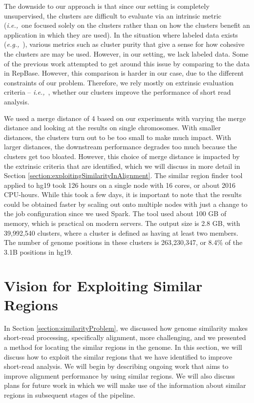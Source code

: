 \documentclass[twocolumn,10pt]{article}
\newcommand{\ie}{{\em i.e.,}~}
\newcommand{\eg}{{\em e.g.,}~}
\begin{document}
The downside to our approach is that since our setting is completely unsupervised, the clusters are difficult to evaluate via an intrinsic metric (\ie one focused solely on the clusters rather than on how the clusters benefit an application in which they are used).  In the situation where labeled data exists (\eg \cite{Cohen:2005}), various metrics such as cluster purity that give a sense for how cohesive the clusters are may be used.  However, in our setting, we lack labeled data.  Some of the previous work attempted to get around this issue by comparing to the data in RepBase.  %
However, this comparison is harder in our case, due to the different constraints of our problem.  Therefore, we rely mostly on extrinsic evaluation criteria -- \ie, whether our clusters improve the performance of short read analysis.

We used a merge distance of 4 based on our experiments with varying the merge distance and looking at the results on single chromosomes.  With smaller distances, the clusters turn out to be too small to make much impact.  With larger distances, the downstream performance degrades too much because the clusters get too bloated.  However, this choice of merge distance is impacted by the extrinsic criteria that are identified, which we will discuss in more detail in Section \ref{section:exploitingSimilarityInAlignment}.  The similar region finder tool applied to hg19 took 126 hours on a single node with 16 cores, or about 2016 CPU-hours.  While this took a few days, it is important to note that the results could be obtained faster by scaling out onto multiple nodes with just a change to the job configuration since we used Spark.  The tool used about 100 GB of memory, which is practical on modern servers.  The output size is 2.8 GB, with 39,992,540 clusters, where a cluster is defined as having at least two members.  The number of genome positions in these clusters is 263,230,347, or 8.4\% of the 3.1B positions in hg19.

\section{Vision for Exploiting Similar Regions}
\label{section:visionExploitingSimilarRegions}

In Section \ref{section:similarityProblem}, we discussed how genome similarity makes short-read processing, specifically alignment, more challenging, and we presented a method for locating the similar regions in the genome.  In this section, we will discuss how to exploit the similar regions that we have identified to improve short-read analysis.  We will begin by describing ongoing work that aims to improve alignment performance by using similar regions.  We will also discuss plans for future work in which we will make use of the information about similar regions in subsequent stages of the pipeline.
\end{document}
